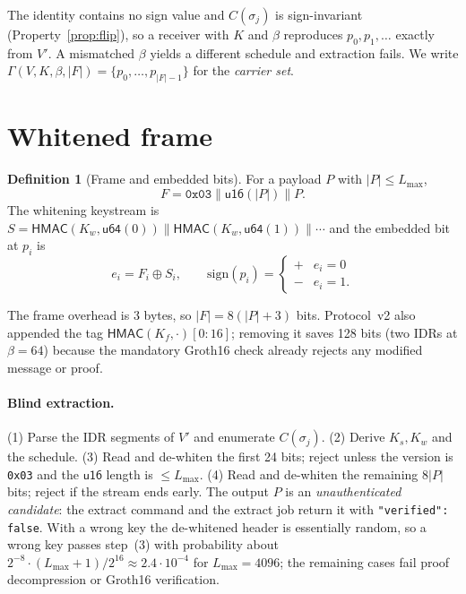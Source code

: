 \documentclass[11pt,a4paper]{article}
\theoremstyle{definition}
\newtheorem{definition}{Definition}
\theoremstyle{remark}
\newcommand{\HMAC}{\mathsf{HMAC}}
\newcommand{\cat}{\parallel}
\begin{document}
The identity contains no sign value and $C(\sigma_j)$ is sign-invariant
(Property~\ref{prop:flip}), so a receiver with $K$ and $\beta$ reproduces
$p_0,p_1,\ldots$ exactly from $V'$. A mismatched $\beta$ yields a different
schedule and extraction fails. We write
$\Gamma(V,K,\beta,|F|)=\{p_0,\ldots,p_{|F|-1}\}$ for the \emph{carrier set}.

\section{Whitened frame}\label{sec:frame}
\begin{definition}[Frame and embedded bits]
For a payload $P$ with $|P|\le L_{\max}$,
\[
F=\texttt{0x03}\cat\mathsf{u16}(|P|)\cat P .
\]
The whitening keystream is
$S=\HMAC(K_w,\mathsf{u64}(0))\cat\HMAC(K_w,\mathsf{u64}(1))\cat\cdots$
and the embedded bit at $p_i$ is
\[
e_i=F_i\oplus S_i,\qquad\text{sign}(p_i)=\begin{cases}+&e_i=0\\-&e_i=1.\end{cases}
\]
\end{definition}
The frame overhead is 3 bytes, so $|F|=8(|P|+3)$ bits. Protocol~v2 also appended the tag
$\HMAC(K_f,\cdot)[0{:}16]$; removing it saves 128 bits (two IDRs at
$\beta=64$) because the mandatory Groth16 check already rejects any modified
message or proof.

\paragraph{Blind extraction.}
(1) Parse the IDR segments of $V'$ and enumerate $C(\sigma_j)$.
(2) Derive $K_s,K_w$ and the schedule.
(3) Read and de-whiten the first 24 bits; reject unless the version is
\texttt{0x03} and the $\mathsf{u16}$ length is $\le L_{\max}$.
(4) Read and de-whiten the remaining $8|P|$ bits; reject if the stream ends
early. The output $P$ is an \emph{unauthenticated candidate}: the extract
command and the extract job return it with \texttt{"verified": false}.
With a wrong key the de-whitened header is essentially random, so a wrong key
passes step~(3) with probability about
$2^{-8}\cdot(L_{\max}+1)/2^{16}\approx2.4\cdot10^{-4}$ for $L_{\max}=4096$; the
remaining cases fail proof decompression or Groth16 verification.
\end{document}
